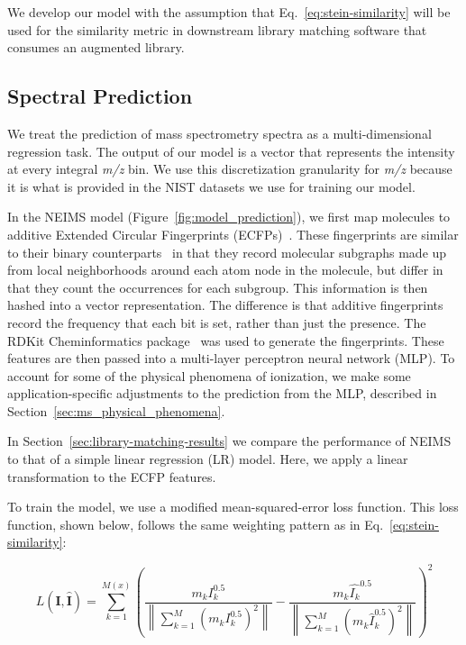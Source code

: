 We develop our model with the assumption that Eq.~\eqref{eq:stein-similarity} will be used for the similarity metric in downstream library matching software that consumes an augmented library.

\subsection{Spectral Prediction}\label{sec:ms_spectral_prediction}

We treat the prediction of mass spectrometry spectra as a multi-dimensional regression task. The output of our model is a vector that represents the intensity at every integral \textit{m/z} bin. We use this discretization granularity for \textit{m/z} because it is what is provided in the NIST datasets we use for training our model.

In the NEIMS model (Figure~\ref{fig:model_prediction}), we first map molecules to additive Extended Circular Fingerprints (ECFPs)~\cite{rdkit}.
These fingerprints are similar to their binary counterparts~\cite{Rogers_2010_ECFP} in that they record molecular subgraphs made up from local neighborhoods around each atom node in the molecule, but differ in that they count the occurrences for each subgroup. This information is then hashed into a vector representation. The difference is that additive fingerprints record the frequency that each bit is set, rather than just the presence. The RDKit Cheminformatics package~\cite{rdkit} was used to generate the fingerprints.
These features are then passed into a multi-layer perceptron neural network (MLP).
To account for some of the physical phenomena of ionization, we make some application-specific adjustments to the prediction from the MLP, described in Section~\ref{sec:ms_physical_phenomena}.

In Section~\ref{sec:library-matching-results} we compare the performance of NEIMS to that of a simple linear regression (LR) model. Here, we apply a linear transformation to the ECFP features.

To train the model, we use a modified mean-squared-error loss function. This loss function, shown below, follows the same weighting pattern as in Eq.~\ref{eq:stein-similarity}:

\begin{equation}\label{eq:training_loss}
    L(\boldsymbol{I}, \hat{\boldsymbol{I}}) = \sum_{k=1}^{M(x)} \left(\frac{m_k I_k^{0.5}}{\left\lVert\sum_{k=1}^{M} (m_{k} I_{k}^{0.5})^2\right\rVert} - \frac{m_k \hat{I_k}^{0.5}}{\left\lVert\sum_{k=1}^{M} (m_{k} \hat{I}_{k}^{0.5})^2\right\rVert}\right)^2
\end{equation}

